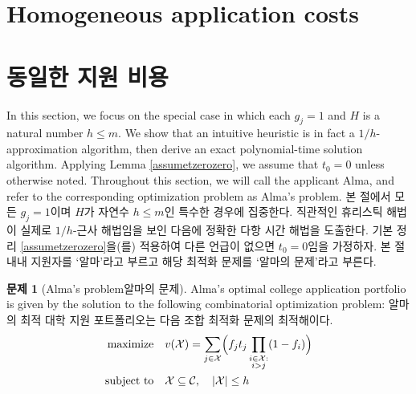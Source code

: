 \documentclass[11pt]{article} %
\theoremstyle{definition}
\newtheorem{problem}{Problem}
\theoremstyle{definition}
\newtheorem{problem}{문제}
\begin{document}
\ifen \section{Homogeneous application costs}  \else \section{동일한 지원 비용} \fi \label{homogappcosts}
\ifen In this section, we focus on the special case in which each $g_j = 1$ and $H$ is a natural number $h \leq m$.   We show that an intuitive heuristic is in fact a $1/h$-approximation algorithm, then derive an exact polynomial-time solution algorithm. 
Applying Lemma \ref{assumetzerozero}, we assume that $t_0 = 0$ unless otherwise noted. Throughout this section, we will call the applicant Alma, and refer to the corresponding optimization problem as Alma's problem. 
\else
본 절에서 모든 $g_j = 1$이며 $H$가 자연수 $h \leq m$인 특수한 경우에 집중한다. 직관적인 휴리스틱 해법이 실제로 $1/h$-근사 해법임을 보인 다음에 정확한 다항 시간 해법을 도출한다. 
기본 정리 \ref{assumetzerozero}을(를) 적용하여 다른 언급이 없으면 $t_0 = 0$임을 가정하자. 본 절 내내 지원자를 `알마'라고 부르고 해당 최적화 문제를 `알마의 문제'라고 부른다.
\fi

\begin{problem}[\ifen Alma’s problem\else 알마의 문제\fi]
\ifen Alma's optimal college application portfolio is given by the solution to the following combinatorial optimization problem:
\else
알마의 최적 대학 지원 포트폴리오는 다음 조합 최적화 문제의 최적해이다.
\fi
\begin{align}
\begin{split}
\text{maximize}\quad &  v(\mathcal{X}) = \sum_{j\in
\mathcal{X}} \Bigl( f_j t_j \prod_{\substack{i \in \mathcal{X}: \\ i > j}} (1 - f_{i}) \Bigr)\\
\text{subject to}\quad & \mathcal{X}\subseteq\mathcal{C}, \quad|\mathcal{X}| \leq h 
\end{split}
\end{align}
\end{problem}
\end{document}
